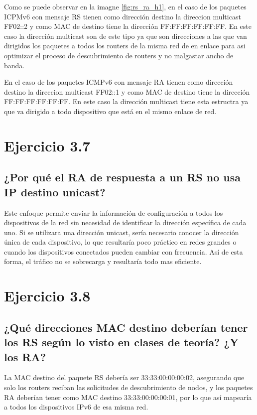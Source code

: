Como se puede observar en la imagne \ref{fig:rs_ra_h1}, en el caso de los paquetes ICPMv6 con mensaje RS tienen como dirección destino la direccion multicast FF02::2 y como MAC de destino tiene la dirección FF:FF:FF:FF:FF:FF. En este caso la dirección multicast son de este tipo ya que son direcciones a las que van dirigidos los paquetes a todos los routers de la misma red de en enlace para asi optimizar el proceso de descubrimiento de routers y no malgastar ancho de banda.

En el caso de los paquetes ICMPv6 con mensaje RA tienen como dirección destino la direccion multicast FF02::1 y como MAC de destino tiene la dirección FF:FF:FF:FF:FF:FF. En este caso la dirección multicast tiene esta estructra ya que va dirigido a todo dispositivo que está en el mismo enlace de red. 

\section{Ejercicio 3.7}
\subsection{¿Por qué el RA de respuesta a un RS no usa IP destino unicast?}

Este enfoque permite enviar la información de configuración a todos los dispositivos de la red sin necesidad de identificar la dirección específica de cada uno. Si se utilizara una dirección unicast, sería necesario conocer la dirección única de cada dispositivo, lo que resultaría poco práctico en redes grandes o cuando los dispositivos conectados pueden cambiar con frecuencia. Así de esta forma, el tráfico no se sobrecarga y resultaría todo mas eficiente.

\section{Ejercicio 3.8}
\subsection{¿Qué direcciones MAC destino deberían tener los RS según lo visto en clases de teoría? ¿Y los RA?}

La MAC destino del paquete RS debería ser 33:33:00:00:00:02, asegurando que solo los routers reciban las solicitudes de descubrimiento de nodos, y los paquetes RA deberían tener como MAC destino 33:33:00:00:00:01, por lo que así mapearía a todos los dispositivos IPv6 de esa misma red.

